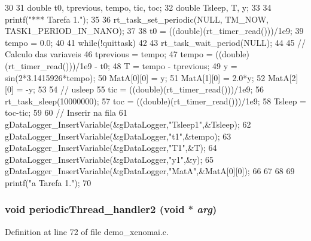 \begin{DoxyCode}
30 {
31         double t0, tprevious, tempo, tic, toc;
32         double Tsleep, T, y;
33 
34         printf("\n**** Tarefa 1.");
35 
36         rt_task_set_periodic(NULL, TM_NOW, TASK1_PERIOD_IN_NANO);
37 
38         t0 = ((double)(rt_timer_read()))/1e9;
39         tempo = 0.0;
40 
41         while(!quittask)
42         {       
43                 rt_task_wait_period(NULL);
44 
45                 // Calculo das variaveis
46                 tprevious = tempo;
47                 tempo = ((double)(rt_timer_read()))/1e9 - t0;
48                 T = tempo - tprevious;
49                 y = sin(2*3.1415926*tempo);
50                 MatA[0][0] = y;
51                 MatA[1][0] = 2.0*y;
52                 MatA[2][0] = -y;
53         
54                 // usleep
55                 tic = ((double)(rt_timer_read()))/1e9;
56                 rt_task_sleep(10000000);
57                 toc = ((double)(rt_timer_read()))/1e9;
58                 Tsleep = toc-tic;
59 
60                 // Inserir na fila
61                 gDataLogger_InsertVariable(&gDataLogger,"Tsleep1",&Tsleep);
62                 gDataLogger_InsertVariable(&gDataLogger,"t1",&tempo);
63                 gDataLogger_InsertVariable(&gDataLogger,"T1",&T);
64                 gDataLogger_InsertVariable(&gDataLogger,"y1",&y);
65                 gDataLogger_InsertVariable(&gDataLogger,"MatA",&MatA[0][0]);
66 
67         }
68 
69         printf("\nEncerrando a Tarefa 1.");
70 }
\end{DoxyCode}
\subsubsection[{periodicThread\_\-handler2}]{\setlength{\rightskip}{0pt plus 5cm}void periodicThread\_\-handler2 (void $\ast$ {\em arg})}\label{demo__xenomai_8c_a8597333258522dddfc564b5d86ef18fa}


Definition at line 72 of file demo\_\-xenomai.c.


